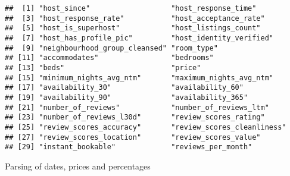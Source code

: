 \begin{verbatim}
##  [1] "host_since"                   "host_response_time"          
##  [3] "host_response_rate"           "host_acceptance_rate"        
##  [5] "host_is_superhost"            "host_listings_count"         
##  [7] "host_has_profile_pic"         "host_identity_verified"      
##  [9] "neighbourhood_group_cleansed" "room_type"                   
## [11] "accommodates"                 "bedrooms"                    
## [13] "beds"                         "price"                       
## [15] "minimum_nights_avg_ntm"       "maximum_nights_avg_ntm"      
## [17] "availability_30"              "availability_60"             
## [19] "availability_90"              "availability_365"            
## [21] "number_of_reviews"            "number_of_reviews_ltm"       
## [23] "number_of_reviews_l30d"       "review_scores_rating"        
## [25] "review_scores_accuracy"       "review_scores_cleanliness"   
## [27] "review_scores_location"       "review_scores_value"         
## [29] "instant_bookable"             "reviews_per_month"
\end{verbatim}

Parsing of dates, prices and percentages

